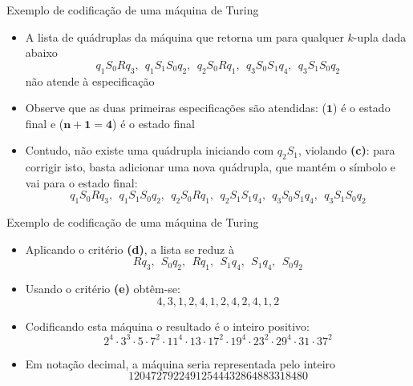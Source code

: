 \begin{frame}[fragile]{Exemplo de codificação de uma máquina de Turing}

    \begin{itemize}
        \item A lista de quádruplas da máquina que retorna um para qualquer $k$-upla dada abaixo
        \[
            q_1S_0Rq_3, \ \ q_1S_1S_0q_2, \ \ q_2S_0Rq_1, \ \ q_3S_0S_1q_4, \ \ q_3S_1S_0q_2
        \]
        não atende à especificação

        \item Observe que as duas primeiras especificações são atendidas: ($\mathbf{1}$) é o 
            estado final e ($\mathbf{n + 1} = \mathbf{4}$) é o estado final

        \item Contudo, não existe uma quádrupla iniciando com $q_2S_1$, violando \textbf{(c)}:
            para corrigir isto, basta adicionar uma nova quádrupla, que mantém o símbolo e 
            vai para o estado final:
        \[
            q_1S_0Rq_3, \ \ q_1S_1S_0q_2, \ \ q_2S_0Rq_1,\ \ q_2S_1S_1q_4,\ \ q_3S_0S_1q_4, \ \ q_3S_1S_0q_2
        \]
        
    \end{itemize}

\end{frame}

\begin{frame}[fragile]{Exemplo de codificação de uma máquina de Turing}

    \begin{itemize}
        \item Aplicando o critério \textbf{(d)}, a lista se reduz à
        \[
            Rq_3, \ \ S_0q_2, \ \ Rq_1,\ \ S_1q_4,\ \ S_1q_4, \ \ S_0q_2
        \]

        \item Usando o critério \textbf{(e)} obtêm-se:
        \[
            4, 3, 1, 2, 4, 1, 2, 4, 2, 4, 1, 2
        \]

        \item Codificando esta máquina o resultado é o inteiro positivo:
        \[
            2^4\cdot 3^3\cdot 5\cdot 7^2\cdot 11^4\cdot 13\cdot 17^2\cdot 19^4\cdot 23^2\cdot 29^4\cdot 31\cdot 37^2
        \]

        \item Em notação decimal, a máquina seria representada pelo inteiro
        \[
            12047279224912544432864883318480
        \]
    \end{itemize}

\end{frame}

